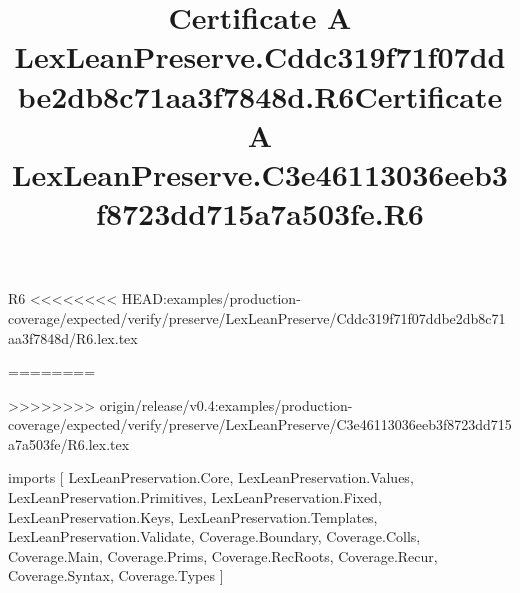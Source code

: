 \begin{lexlean}{R6}
<<<<<<<< HEAD:examples/production-coverage/expected/verify/preserve/LexLeanPreserve/Cddc319f71f07ddbe2db8c71aa3f7848d/R6.lex.tex
\title{Certificate A LexLeanPreserve.Cddc319f71f07ddbe2db8c71aa3f7848d.R6}
========
\title{Certificate A LexLeanPreserve.C3e46113036eeb3f8723dd715a7a503fe.R6}
>>>>>>>> origin/release/v0.4:examples/production-coverage/expected/verify/preserve/LexLeanPreserve/C3e46113036eeb3f8723dd715a7a503fe/R6.lex.tex
\begin{coremodule}
imports [
  LexLeanPreservation.Core,
  LexLeanPreservation.Values,
  LexLeanPreservation.Primitives,
  LexLeanPreservation.Fixed,
  LexLeanPreservation.Keys,
  LexLeanPreservation.Templates,
  LexLeanPreservation.Validate,
  Coverage.Boundary,
  Coverage.Colls,
  Coverage.Main,
  Coverage.Prims,
  Coverage.RecRoots,
  Coverage.Recur,
  Coverage.Syntax,
  Coverage.Types
]


\end{coremodule}
\end{lexlean}
